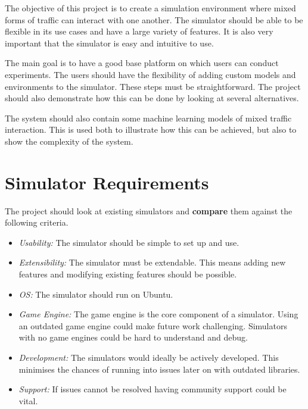 The objective of this project is to create a simulation environment where mixed forms of traffic can interact with one another. The simulator should be able to be flexible in its use cases and have a large variety of features. It is also very important that the simulator is easy and intuitive to use.  

The main goal is to have a good base platform on which users can conduct experiments. The users should have the flexibility of adding custom models and environments to the simulator. These steps must be straightforward. The project should also demonstrate how this can be done by looking at several alternatives. 

The system should also contain some machine learning models of mixed traffic interaction. This is used both to illustrate how this can be achieved, but also to show the complexity of the system. 

\section{Simulator Requirements}
The project should look at existing simulators and \textbf{compare} them against the following criteria.
\begin{itemize}
    \item \emph{Usability:} The simulator should be simple to set up and use.
    \item \emph{Extensibility:} The simulator must be extendable. This means adding new features and modifying existing features should be possible. 
    \item \emph{OS:} The simulator should run on Ubuntu.
    \item \emph{Game Engine:} The game engine is the core component of a simulator. Using an outdated game engine could make future work challenging. Simulators with no game engines could be hard to understand and debug. 
    \item \emph{Development:} The simulators would ideally be actively developed. This minimises the chances of running into issues later on with outdated libraries. 
    \item \emph{Support:} If issues cannot be resolved having community support could be vital.
\end{itemize}
\\~\\
